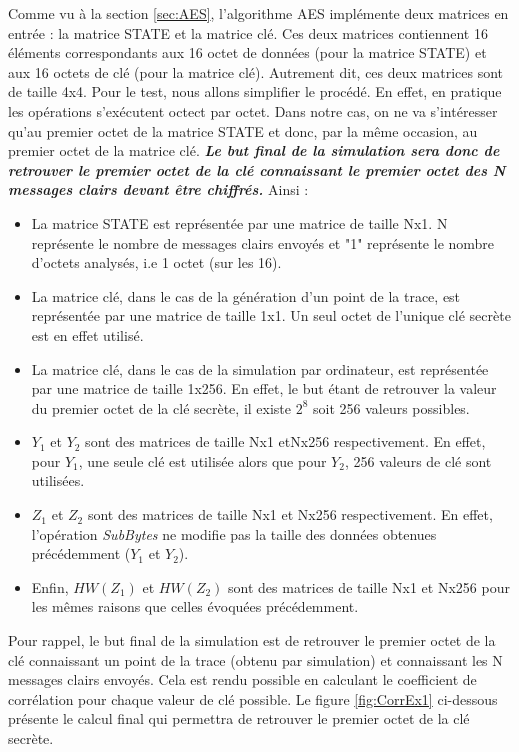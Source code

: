 \documentclass[oneside]{book}
\begin{document}
\vspace{-0.3 cm}Comme vu à la section \ref{sec:AES}, l'algorithme AES implémente deux matrices en entrée : la matrice STATE et la matrice clé. Ces deux matrices contiennent 16 éléments correspondants aux 16 octet de données (pour la matrice STATE) et aux 16 octets de clé (pour la matrice clé). Autrement dit, ces deux matrices sont de taille 4x4. Pour le test, nous allons simplifier le procédé. En effet, en pratique les opérations s'exécutent octect par octet. Dans notre cas, on ne va s'intéresser qu'au premier octet de la matrice STATE et donc, par la même occasion, au premier octet de la matrice clé. \textbf{\textit{Le but final de la simulation sera donc de retrouver le premier octet de la clé connaissant le premier octet des N messages clairs devant être chiffrés.}}
Ainsi :
\begin{itemize}
\item La matrice STATE est représentée par une matrice de taille Nx1. N représente le nombre de messages clairs envoyés et "1" représente le nombre d'octets analysés, i.e 1 octet (sur les 16).
\item La matrice clé, dans le cas de la génération d'un point de la trace, est représentée par une matrice de taille 1x1. Un seul octet de l'unique clé secrète est en effet utilisé.
\item La matrice clé, dans le cas de la simulation par ordinateur, est représentée par une matrice de taille 1x256. En effet, le but étant de retrouver la valeur du premier octet de la clé secrète, il existe $2^8$ soit 256 valeurs possibles.
\item $Y_1$ et $Y_2$ sont des matrices de taille Nx1 etNx256 respectivement. En effet, pour $Y_1$, une seule clé est utilisée alors que pour $Y_2$, 256 valeurs de clé sont utilisées.
\item $Z_1$ et $Z_2$ sont des matrices de taille Nx1 et Nx256 respectivement. En effet, l'opération \textit{SubBytes} ne modifie pas la taille des données obtenues précédemment ($Y_1$ et $Y_2$).
\item Enfin, $HW(Z_1)$ et $HW(Z_2)$ sont des matrices de taille Nx1 et Nx256 pour les mêmes raisons que celles évoquées précédemment. \\
\end{itemize}

\vspace{-0.2 cm}Pour rappel, le but final de la simulation est de retrouver le premier octet de la clé connaissant un point de la trace (obtenu par simulation) et connaissant les N messages clairs envoyés. Cela est rendu possible en calculant le coefficient de corrélation pour chaque valeur de clé possible. Le figure \ref{fig:CorrEx1} ci-dessous présente le calcul final qui permettra de retrouver le premier octet de la clé secrète.
\end{document}
